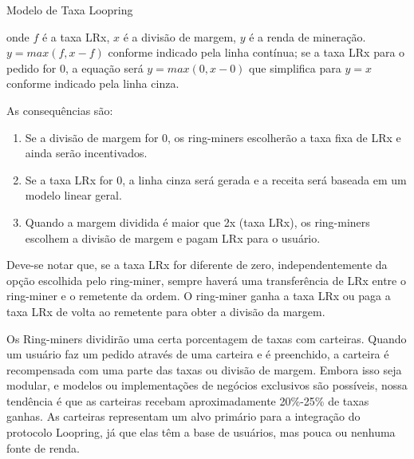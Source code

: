 \documentclass[UTF8,nofonts]{article}
\makeatletter
\newenvironment{figurehere}
 {\def\@captype{figure}}
 {}
\makeatother
\begin{document}
\begin{multicols}{2}
\begin{center}
\begin{figurehere}
\begin{tikzpicture}[
font=\bfseries\footnotesize\sffamily,
oneway/.style={->,dashed,shorten >=2pt,shorten <=2pt,>=stealth},
scale=1]
\end{tikzpicture}
\caption{Modelo de Taxa Loopring}
\label{fig:feemodel}
\end{figurehere}
\end{center}


onde $f$ é a taxa LRx, $x$ é a divisão de margem, $y$ é a renda de mineração. $y=max(f, x-f)$ conforme indicado pela linha contínua; se a taxa LRx para o pedido for $0$, a equação será $y=max(0, x - 0)$ que simplifica para $y=x$ conforme indicado pela linha cinza.


As consequências são:  
\begin{enumerate}
	\item Se a divisão de margem for 0, os ring-miners escolherão a taxa fixa de LRx e ainda serão incentivados. 
	\item Se a taxa LRx for 0, a linha cinza será gerada e a receita será baseada em um modelo linear geral.
	\item Quando a margem dividida é maior que 2x (taxa LRx), os ring-miners escolhem a divisão de margem e pagam LRx para o usuário.
\end{enumerate}

Deve-se notar que, se a taxa LRx for diferente de zero, independentemente da opção escolhida pelo ring-miner, sempre haverá uma transferência de LRx entre o ring-miner e o remetente da ordem. O ring-miner ganha a taxa LRx ou paga a taxa LRx de volta ao remetente para obter a divisão da margem.

Os Ring-miners dividirão uma certa porcentagem de taxas com carteiras. Quando um usuário faz um pedido através de uma carteira e é preenchido, a carteira é recompensada com uma parte das taxas ou divisão de margem. Embora isso seja modular, e modelos ou implementações de negócios exclusivos são possíveis, nossa tendência é que as carteiras recebam aproximadamente 20\%-25\% de taxas ganhas. As carteiras representam um alvo primário para a integração do protocolo Loopring, já que elas têm a base de usuários, mas pouca ou nenhuma fonte de renda.


\end{multicols}
\end{document}

